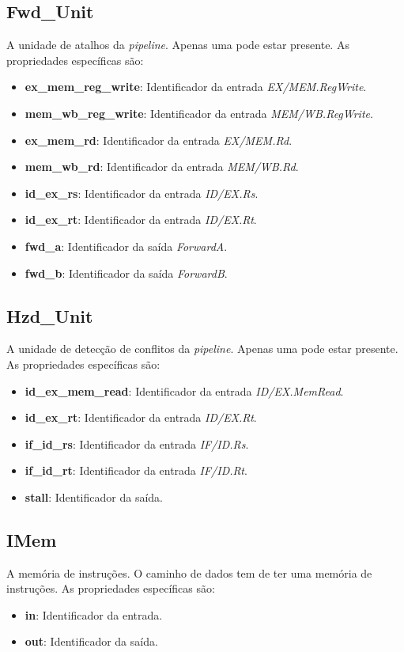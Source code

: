 \documentclass[11pt,a4paper,twoside,titlepage]{report}
\begin{document}
\subsection{Fwd\_Unit}

A unidade de atalhos da \emph{pipeline}. Apenas uma pode estar presente.
As propriedades específicas são:
\begin{itemize}
	\item \textbf{ex\_mem\_reg\_write}: Identificador da entrada \emph{EX/MEM.RegWrite}.
	\item \textbf{mem\_wb\_reg\_write}: Identificador da entrada \emph{MEM/WB.RegWrite}.
	\item \textbf{ex\_mem\_rd}: Identificador da entrada \emph{EX/MEM.Rd}.
	\item \textbf{mem\_wb\_rd}: Identificador da entrada \emph{MEM/WB.Rd}.
	\item \textbf{id\_ex\_rs}: Identificador da entrada \emph{ID/EX.Rs}.
	\item \textbf{id\_ex\_rt}: Identificador da entrada \emph{ID/EX.Rt}.
	\item \textbf{fwd\_a}: Identificador da saída \emph{ForwardA}.
	\item \textbf{fwd\_b}: Identificador da saída \emph{ForwardB}.
\end{itemize}

\subsection{Hzd\_Unit}
A unidade de detecção de conflitos da \emph{pipeline}. Apenas uma pode estar
presente.
As propriedades específicas são:
\begin{itemize}
	\item \textbf{id\_ex\_mem\_read}: Identificador da entrada \emph{ID/EX.MemRead}.
	\item \textbf{id\_ex\_rt}: Identificador da entrada \emph{ID/EX.Rt}.
	\item \textbf{if\_id\_rs}: Identificador da entrada \emph{IF/ID.Rs}.
	\item \textbf{if\_id\_rt}: Identificador da entrada \emph{IF/ID.Rt}.
	\item \textbf{stall}: Identificador da saída.
\end{itemize}

\subsection{IMem}

A memória de instruções. O caminho de dados tem de ter uma memória de instruções.
As propriedades específicas são:
\begin{itemize}
	\item \textbf{in}: Identificador da entrada.
	\item \textbf{out}: Identificador da saída.
\end{itemize}
\end{document}
